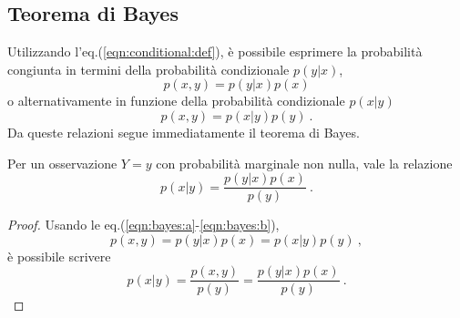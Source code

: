 \subsection{Teorema di Bayes}\label{ch:bayes-thm}
Utilizzando l'eq.(\ref{eqn:conditional:def}), è possibile esprimere la probabilità congiunta in termini della probabilità condizionale $p(y|x)$,
\begin{equation}\label{eqn:bayes:a}
    p(x,y) = p(y|x) p(x)
\end{equation}
o alternativamente in funzione della probabilità condizionale $p(x|y)$
\begin{equation}\label{eqn:bayes:b}
   p(x,y) = p(x|y) p(y) \ .
\end{equation}
Da queste relazioni segue immediatamente il teorema di Bayes.
\begin{theorem}
    Per un osservazione $Y=y$ con probabilità marginale non nulla, vale la relazione
    \begin{equation}
        p(x|y) = \dfrac{ p(y|x) p(x) }{ p(y) } \ .
    \end{equation}
\end{theorem}
\begin{proof}
    Usando le eq.(\ref{eqn:bayes:a}-\ref{eqn:bayes:b}),
    \begin{equation}
        p(x,y) = p(y|x) p(x) = p(x|y) p(y) \ ,
    \end{equation}
    è possibile scrivere
    \begin{equation}
        p(x|y) = \dfrac{ p(x,y) }{ p(y) } = \dfrac{ p(y|x) p(x) }{ p(y) } \ .
    \end{equation}
\end{proof}
